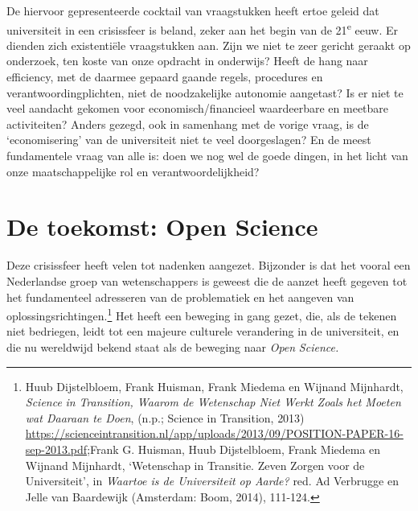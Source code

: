 \documentclass[smallauthor, chapterhaspagenum, nochapterinheader, pagenuminheader,  bigchapnum,medium2, tocpages,  garamond, titleinheader]{jote-book}
\begin{document}
	De hiervoor gepresenteerde cocktail van vraagstukken heeft ertoe geleid dat universiteit in een crisissfeer is beland, zeker aan het begin van de 21\textsuperscript{e} eeuw. Er dienden zich existentiële vraagstukken aan. Zijn we niet te zeer gericht geraakt op onderzoek, ten koste van onze opdracht in onderwijs? Heeft de hang naar efficiency, met de daarmee gepaard gaande regels, procedures en verantwoordingplichten, niet de noodzakelijke autonomie aangetast? Is er niet te veel aandacht gekomen voor economisch/financieel waardeerbare en meetbare activiteiten? Anders gezegd, ook in samenhang met de vorige vraag, is de ‘economisering' van de universiteit niet te veel doorgeslagen? En de meest fundamentele vraag van alle is: doen we nog wel de goede dingen, in het licht van onze maatschappelijke rol en verantwoordelijkheid?



	\section{De toekomst: Open Science }



	Deze crisissfeer heeft velen tot nadenken aangezet. Bijzonder is dat het vooral een Nederlandse groep van wetenschappers is geweest die de aanzet heeft gegeven tot het fundamenteel adresseren van de problematiek en het aangeven van oplossingsrichtingen.\footnote{Huub Dijstelbloem, Frank Huisman, Frank Miedema en Wijnand Mijnhardt, \emph{Science}\emph{ in }\emph{Transition}\emph{, Waarom de Wetenschap Niet Werkt Zoals het Moeten wat Daaraan te Doen}, (n.p.; Science in Transition, 2013) \href{https://scienceintransition.nl/app/uploads/2013/09/POSITION-PAPER-16-sep-2013.pdf}{https://scienceintransition.nl/app/uploads/2013/09/POSITION-PAPER-16-sep-2013.pdf};Frank G. Huisman, Huub Dijstelbloem, Frank Miedema en Wijnand Mijnhardt, ‘Wetenschap in Transitie. Zeven Zorgen voor de Universiteit', in \emph{Waartoe is de Universiteit op Aarde?} red. Ad Verbrugge en Jelle van Baardewijk (Amsterdam: Boom, 2014), 111-124.} Het heeft een beweging in gang gezet, die, als de tekenen niet bedriegen, leidt tot een majeure culturele verandering in de universiteit, en die nu wereldwijd bekend staat als de beweging naar \emph{Open }\emph{Science}\emph{.}
\end{document}
